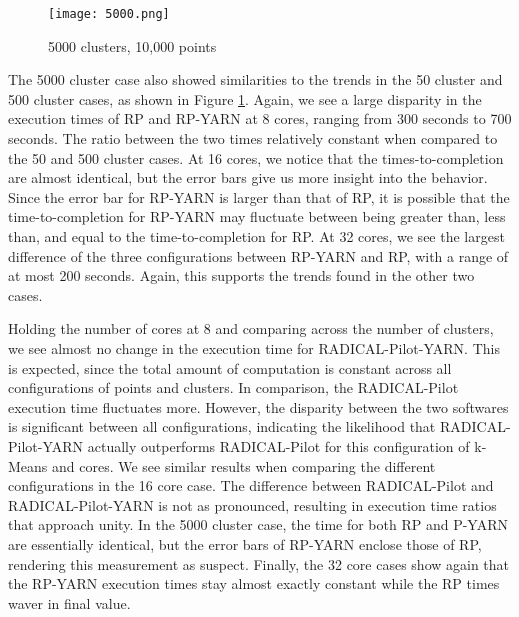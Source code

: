 \documentclass[]{article}
\begin{document}
			\begin{figure}[H]
				\centering
				\texttt{[image: 5000.png]}
				\caption{5000 clusters, 10,000 points}
				\label{fig:5000}
			\end{figure}

			The 5000 cluster case also showed similarities to the trends in the 50 cluster and 500 cluster cases, as shown in Figure \ref{fig:5000}. Again, we see a large disparity in the execution times of RP and RP-YARN at 8 cores, ranging from 300 seconds to 700 seconds. The ratio between the two times relatively constant when compared to the 50 and 500 cluster cases. At 16 cores, we notice that the times-to-completion are almost identical, but the error bars give us more insight into the behavior. Since the error bar for RP-YARN is larger than that of RP, it is possible that the time-to-completion for RP-YARN may fluctuate between being greater than, less than, and equal to the time-to-completion for RP. At 32 cores, we see the largest difference of the three configurations between RP-YARN and RP, with a range of at most 200 seconds. Again, this supports the trends found in the other two cases. 

			
			Holding the number of cores at 8 and comparing across the number of clusters, we see almost no change in the execution time for RADICAL-Pilot-YARN. This is expected, since the total amount of computation is constant across all configurations of points and clusters. In comparison, the RADICAL-Pilot execution time fluctuates more. However, the disparity between the two softwares is significant between all configurations, indicating the likelihood that RADICAL-Pilot-YARN actually outperforms RADICAL-Pilot for this configuration of k-Means and cores. We see similar results when comparing the different configurations in the 16 core case. The difference between RADICAL-Pilot and RADICAL-Pilot-YARN is not as pronounced, resulting in execution time ratios that approach unity. In the 5000 cluster case, the time for both RP and P-YARN are essentially identical, but the error bars of RP-YARN enclose those of RP, rendering this measurement as suspect. Finally, the 32 core cases show again that the RP-YARN execution times stay almost exactly constant while the RP times waver in final value.
\end{document}
